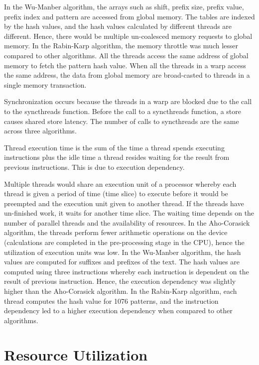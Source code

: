 In the Wu-Manber algorithm, the arrays such as shift, prefix size, prefix value, prefix index and pattern are accessed from global memory. The tables are indexed by the hash values, and the hash values calculated by different threads are different. Hence, there would be multiple un-coalesced memory requests to global memory. In the Rabin-Karp algorithm, the memory throttle was much lesser compared to other algorithms. All the threads access the same address of global memory to fetch the pattern hash value. When all the threads in a warp access the same address, the data from global memory are broad-casted to threads in a single memory transaction. 

Synchronization occurs because the threads in a warp are blocked due to the call to the syncthreads function. Before the call to a syncthreads function, a store causes shared store latency. The number of calls to syncthreads are the same across three algorithms.

Thread execution time is the sum of the time a thread spends executing instructions plus the idle time a thread resides waiting for the result from previous instructions. This is due to execution dependency. 

\vspace{\topsep}

Multiple threads would share an execution unit of a processor whereby each thread is given a period of time (time slice) to execute before it would be preempted and the execution unit given to another thread. If the threads have un-finished work, it waits for another time slice. The waiting time depends on the number of parallel threads and the availability of resources. In the Aho-Corasick algorithm, the threads perform fewer arithmetic operations on the device (calculations are completed in the  pre-processing stage in the CPU), hence the utilization of execution units was low. In the Wu-Manber algorithm, the hash values are computed for suffixes and prefixes of the text. The hash values are computed using three instructions whereby each instruction is dependent on the result of previous instruction. Hence, the execution dependency was slightly higher than the Aho-Corasick algorithm. In the Rabin-Karp algorithm, each thread computes the hash value for 1076 patterns, and the instruction dependency led to a higher execution dependency when compared to other algorithms.

\section{Resource Utilization}
\vspace{\topsep}

